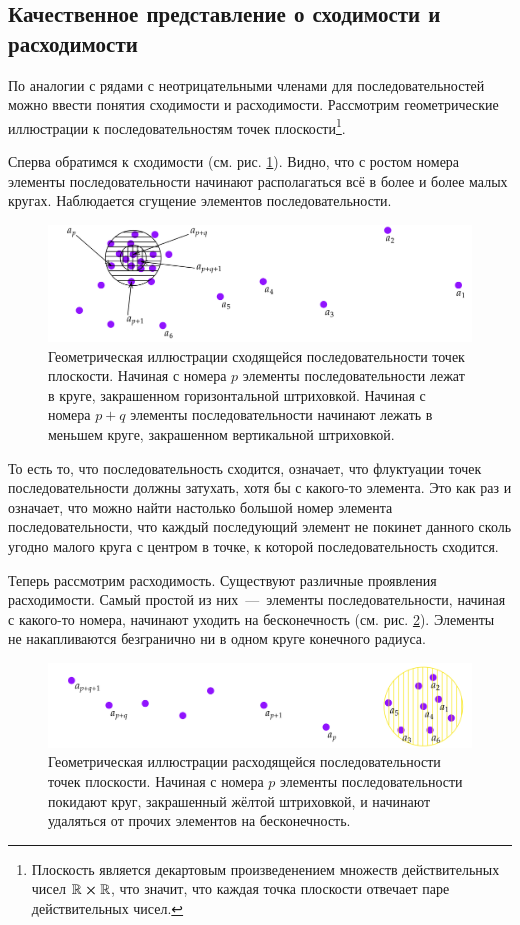 \documentclass[12pt]{article}
\begin{document}
\subsection{Качественное представление о сходимости и расходимости}
По аналогии с рядами с неотрицательными членами для последовательностей можно ввести понятия сходимости и расходимости. Рассмотрим геометрические иллюстрации к последовательностям точек плоскости\footnote{Плоскость является декартовым произведенением множеств действительных чисел $\mathbb{R}\cross \mathbb{R}$, что значит, что каждая точка плоскости отвечает паре действительных чисел.}.
\par
Сперва обратимся к сходимости (см. рис. \ref{fig:1}). Видно, что с ростом номера элементы последовательности начинают располагаться всё в более и более малых кругах. Наблюдается сгущение элементов последовательности. 
\begin{figure}[ht]
    \centering
    \includegraphics[width = 1\textwidth]{fig1.png}
    \caption{Геометрическая иллюстрации сходящейся последовательности точек плоскости. Начиная с номера $p$ элементы последовательности лежат в круге, закрашенном горизонтальной штриховкой. Начиная с номера $p+q$ элементы последовательности начинают лежать в меньшем круге, закрашенном вертикальной штриховкой.}
    \label{fig:1}
\end{figure}
То есть то, что последовательность сходится, означает, что флуктуации точек последовательности должны затухать, хотя бы с какого\--то элемента. Это как раз и означает, что можно найти настолько большой номер элемента последовательности, что каждый последующий элемент не покинет данного сколь угодно малого круга с центром в точке, к которой последовательность сходится.
\par
Теперь рассмотрим расходимость. Существуют различные проявления расходимости. Самый простой из них~\----~элементы последовательности, начиная с какого\--то номера, начинают уходить на бесконечность (см. рис. \ref{fig:2}). Элементы не накапливаются безгранично ни в одном круге конечного радиуса.
\begin{figure}[ht]
    \centering
    \includegraphics[width = 1\textwidth]{fig2.png}
    \caption{Геометрическая иллюстрации расходящейся последовательности точек плоскости. Начиная с номера $p$ элементы последовательности покидают круг, закрашенный жёлтой штриховкой, и начинают удаляться от прочих элементов на бесконечность.}
    \label{fig:2}
\end{figure}
\end{document}
